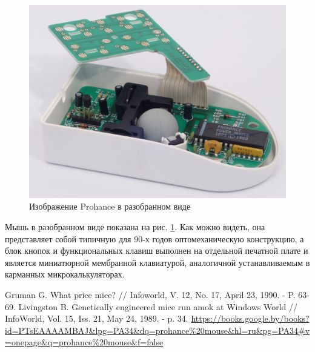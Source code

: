 \documentclass[11pt, a4paper]{article}
\begin{document}
\begin{figure}[h]
    \centering
    \includegraphics[scale=0.8]{1989_prohance_powermouse/6.1.jpg}
    \caption{Изображение Prohance в разобранном виде}
    \label{fig:ProhanceInside}
\end{figure}

Мышь в разобранном виде показана на рис. \ref{fig:ProhanceInside}. Как можно видеть, она представляет собой типичную для 90-х годов оптомеханическую конструкцию, а блок кнопок и функциональных клавиш выполнен на отдельной печатной плате и является миниатюрной мембранной клавиатурой, аналогичной устанавливаемым в карманных микрокалькуляторах.

\begin{thebibliography}{9}
 Gruman G. What price mice? // Infoworld, V. 12, No. 17, April 23, 1990. - P. 63-69.
 Livingston B. Genetically engineered mice run amok at Windows World // InfoWorld, Vol. 15, Iss. 21, May 24, 1989. - p. 34. \url{https://books.google.by/books?id=PTsEAAAAMBAJ&lpg=PA34&dq=prohance%20mouse&hl=ru&pg=PA34#v=onepage&q=prohance%20mouse&f=false}
\end{thebibliography}
\end{document}
